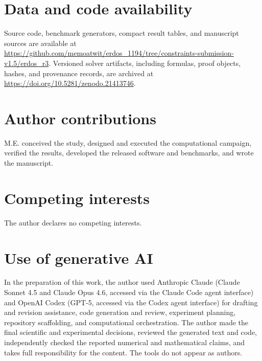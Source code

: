 \documentclass[11pt,reqno]{amsart}
\theoremstyle{definition}
\theoremstyle{remark}
\begin{document}
\section*{Data and code availability}
Source code, benchmark generators, compact result tables, and manuscript
sources are available at
\url{https://github.com/memoatwit/erdos_1194/tree/constraints-submission-v1.5/erdos_r3}. Versioned solver artifacts,
including formulas, proof objects, hashes, and provenance records, are
archived at \url{https://doi.org/10.5281/zenodo.21413746}.

\section*{Author contributions}
M.E. conceived the study, designed and executed the computational campaign,
verified the results, developed the released software and benchmarks, and
wrote the manuscript.

\section*{Competing interests}
The author declares no competing interests.


\section*{Use of generative AI}
In the preparation of this work, the author used Anthropic Claude
(Claude Sonnet 4.5 and Claude Opus 4.6, accessed via the Claude Code agent
interface) and OpenAI Codex (GPT-5, accessed via the Codex agent interface)
for drafting and revision assistance, code generation and review, experiment
planning, repository scaffolding, and computational orchestration. The author
made the final scientific and experimental decisions, reviewed the generated
text and code, independently checked the reported numerical and mathematical
claims, and takes full responsibility for the content. The tools do not
appear as authors.



\end{document}
